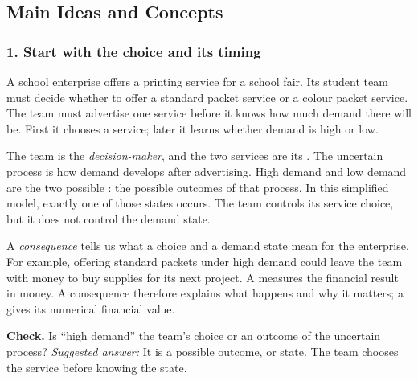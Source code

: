 	\subsection{Main Ideas and Concepts}
\label{sec:main-ideas-and-concepts}

\subsubsection*{1. Start with the choice and its timing}
A school enterprise offers a printing service for a school fair. Its student team must decide whether to offer a standard packet service or a colour packet service. The team must advertise one service before it knows how much demand there will be. First it chooses a service; later it learns whether demand is high or low.

The team is the \emph{decision-maker}, and the two services are its \emph{}. The uncertain process is how demand develops after advertising. High demand and low demand are the two possible \emph{  }: the possible outcomes of that process. In this simplified model, exactly one of those states occurs. The team controls its service choice, but it does not control the demand state.

A \emph{consequence} tells us what a choice and a demand state mean for the enterprise. For example, offering standard packets under high demand could leave the team with money to buy supplies for its next project. A \emph{} measures the financial result in money. A consequence therefore explains what happens and why it matters; a  gives its numerical financial value.

\textbf{Check.} Is ``high demand'' the team's choice or an outcome of the uncertain process? \emph{Suggested answer:} It is a possible outcome, or state. The team chooses the service before knowing the state.

